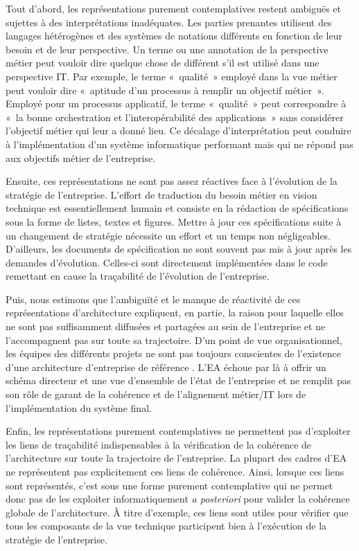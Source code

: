 Tout d'abord, les représentations purement contemplatives restent ambiguës et
sujettes à des interprétations inadéquates. Les parties prenantes utilisent des
langages hétérogènes et des systèmes de notations différents en fonction de
leur besoin et de leur perspective. Un terme ou une annotation de la
perspective métier peut vouloir dire quelque chose de différent s'il est
utilisé dans une perspective IT. Par exemple, le terme «~qualité~» employé dans
la vue métier peut vouloir dire «~aptitude d'un processus à remplir un objectif
métier~». Employé pour un processus applicatif, le terme «~qualité~» peut
correspondre à «~la bonne orchestration et l'interopérabilité des
applications~» sans considérer l'objectif métier qui leur a donné lieu. Ce
décalage d'interprétation peut conduire à l'implémentation d'un système
informatique performant mais qui ne répond pas aux objectifs métier de
l'entreprise.

Ensuite, ces représentations ne sont pas assez réactives face à l'évolution de
la stratégie de l'entreprise. L'effort de traduction du besoin métier en vision
technique est essentiellement humain et consiste en la rédaction de
spécifications sous la forme de listes, textes et figures. Mettre à jour ces
spécifications suite à un changement de stratégie nécessite un effort et un
temps non négligeables. D'ailleurs, les documents de spécification ne sont
souvent pas mis à jour après les demandes d'évolution. Celles-ci sont
directement implémentées dans le code remettant en cause la traçabilité de
l'évolution de l'entreprise.

Puis, nous estimons que l'ambiguïté et le manque de réactivité de ces
représentations d'architecture expliquent, en partie, la raison pour laquelle
elles ne sont pas suffisamment diffusées et partagées au sein de l'entreprise
et ne l'accompagnent pas sur toute sa trajectoire. D'un point de vue
organisationnel, les équipes des différents projets ne sont pas toujours
conscientes de l'existence d'une architecture d'entreprise de référence
\cite{shah2007frameworks}. L'EA échoue par là à offrir un schéma directeur et
une vue d'ensemble de l'état de l'entreprise et ne remplit pas son rôle de
garant de la cohérence et de l'alignement métier/IT lors de l'implémentation du
système final.

Enfin, les représentations purement contemplatives ne permettent pas
d'exploiter les liens de traçabilité indispensables à la vérification de la
cohérence de l'architecture sur toute la trajectoire de l'entreprise. La
plupart des cadres d'EA ne représentent pas explicitement ces liens de
cohérence. Ainsi, lorsque ces liens sont représentés, c'est sous une forme
purement contemplative qui ne permet donc pas de les exploiter informatiquement
\textit{a posteriori} pour valider la cohérence globale de l'architecture. À
titre d'exemple, ces liens sont utiles pour vérifier que tous les composants de
la vue technique participent bien à l'exécution de la stratégie de
l'entreprise.

